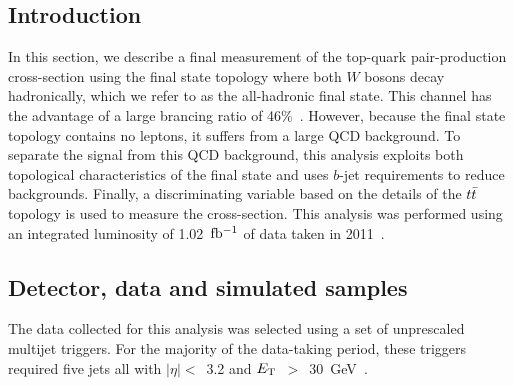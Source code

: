 \subsection{Introduction}

In this section, we describe a final measurement of the top-quark pair-production cross-section using the final state topology where both $W$ bosons decay hadronically, 
which we refer to as the all-hadronic final state.
This channel has the advantage of a large brancing ratio of 46\%~\cite{ref:PDG}.
However, because the final state topology contains no leptons, it suffers from a large QCD background.
To separate the signal from this QCD background, this analysis exploits both topological characteristics
of the final state and uses $b$-jet requirements to reduce backgrounds.
Finally, a discriminating variable based on the details of the $t\bar{t}$ topology is used to measure the cross-section.
This analysis was performed using an integrated luminosity of 1.02~$\mbox{fb$^{-1}$}$ of data taken in 2011~\cite{ref:ATLAS}.



\subsection{Detector, data and simulated samples}
\label{sec:datasample}


The data collected for this analysis was selected using a set of unprescaled multijet triggers.
For the majority of the data-taking period, these triggers required five jets all with 
$|\eta| <$~3.2 and $E_{\mathrm{T}}$~$>$~30~GeV~\cite{ref:JetTrigger}.

